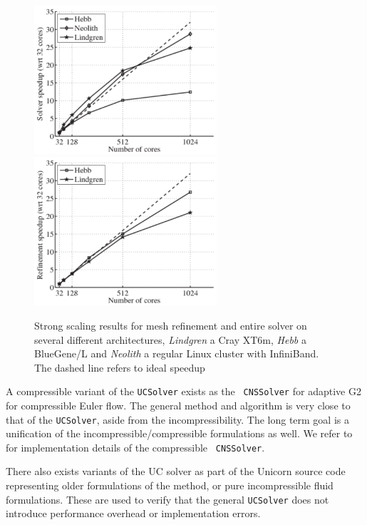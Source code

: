\begin{figure}
\centering
\includegraphics[height=5.5cm]{chapters/hoffman-2/pdf/speedup_solve.pdf}
\includegraphics[height=5.5cm]{chapters/hoffman-2/pdf/speedup_unrivara.pdf}
\caption{\label{fig:hoffman-2:sp} Strong scaling results for mesh refinement and entire solver on several different architectures, \textit{Lindgren} a Cray XT6m, \textit{Hebb} a BlueGene/L and \textit{Neolith} a regular Linux cluster with InfiniBand. The dashed line refers to ideal speedup}
\end{figure}

A compressible variant of the {\tt UCSolver} exists as the {\tt
  CNSSolver} for adaptive G2 for compressible Euler flow. The general
  method and algorithm is very close to that of the {\tt UCSolver},
  aside from the incompressibility. The long term goal is a
  unification of the incompressible/compressible formulations as
  well. We refer to
\citet{Nazarov2009} for implementation details of the compressible {\tt
  CNSSolver}.

There also exists variants of the UC solver as part of the Unicorn
source code representing older formulations of the method, or pure
incompressible fluid formulations. These are used to verify that the
general {\tt UCSolver} does not introduce performance overhead or
implementation errors.

